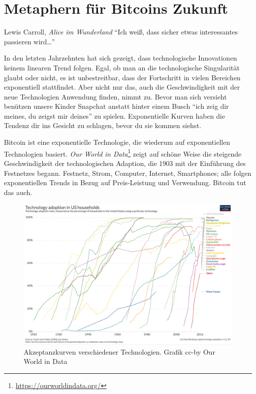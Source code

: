 \chapter{Metaphern für Bitcoins Zukunft}
\label{les:21}

\begin{chapquote}{Lewis Carroll, \textit{Alice im Wunderland}}
\enquote{Ich weiß, dass sicher etwas interessantes passieren wird\ldots}
\end{chapquote}

In den letzten Jahrzehnten hat sich gezeigt, dass technologische Innovationen
keinem linearen Trend folgen. Egal, ob man an die technologische Singularität
glaubt oder nicht, es ist unbestreitbar, dass der Fortschritt in vielen
Bereichen exponentiell stattfindet. Aber nicht nur das, auch die
Geschwindigkeit mit der neue Technologien Anwendung finden, nimmt zu. Bevor man
sich versieht benützen unsere Kinder Snapchat anstatt hinter einem Busch
\enquote{ich zeig dir meines, du zeigst mir deines} zu spielen. Exponentielle
Kurven haben die Tendenz dir ins Gesicht zu schlagen, bevor du sie kommen
siehst.

Bitcoin ist eine exponentielle Technologie, die wiederum auf exponentiellen
Technologien basiert. \textit{Our World in
Data}\footnote{\url{https://ourworldindata.org/}} zeigt auf schöne Weise die
steigende Geschwindigkeit der technologischen Adaption, die 1903 mit der
Einführung des Festnetzes begann. Festnetz, Strom, Computer, Internet,
Smartphones; alle folgen exponentiellen Trends in Bezug auf Preis-Leistung und
Verwendung. Bitcoin tut das auch.

\begin{figure}
  \includegraphics[width=\textwidth]{assets/images/tech-adoption.png}
  \caption{Akzeptanzkurven verschiedener Technologien. Grafik cc-by Our World in Data}
  \label{fig:tech-adoption}
\end{figure}

